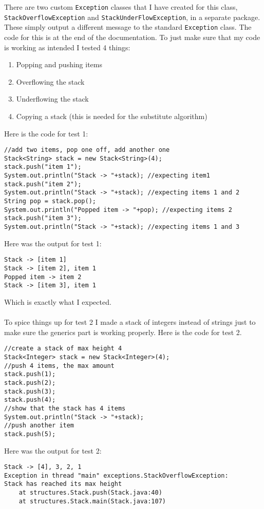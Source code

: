 \documentclass[../../../../main.tex]{subfiles}
\begin{document}
There are two custom \texttt{Exception} classes that I have created for this class, \texttt{StackOverflowException} and \texttt{StackUnderFlowException}, in a separate package. These simply output a different message to the standard \texttt{Exception} class. The code for this is at the end of the documentation.
\newpage
\noindent
To just make sure that my code is working as intended I tested 4 things:
\begin{enumerate}
\item Popping and pushing items
\item Overflowing the stack
\item Underflowing the stack
\item Copying a stack (this is needed for the substitute algorithm)
\end{enumerate}
Here is the code for test 1:
\begin{verbatim}
//add two items, pop one off, add another one
Stack<String> stack = new Stack<String>(4);
stack.push("item 1");
System.out.println("Stack -> "+stack); //expecting item1
stack.push("item 2");
System.out.println("Stack -> "+stack); //expecting items 1 and 2
String pop = stack.pop();
System.out.println("Popped item -> "+pop); //expecting items 2
stack.push("item 3");
System.out.println("Stack -> "+stack); //expecting items 1 and 3
\end{verbatim}
Here was the output for test 1:
\begin{verbatim}
Stack -> [item 1]
Stack -> [item 2], item 1
Popped item -> item 2
Stack -> [item 3], item 1
\end{verbatim}
Which is exactly what I expected.\\ \\
To spice things up for test 2 I made a stack of integers instead of strings just to make sure the generics part is working properly. Here is the code for test 2.
\begin{verbatim}
//create a stack of max height 4
Stack<Integer> stack = new Stack<Integer>(4);
//push 4 items, the max amount
stack.push(1);
stack.push(2);
stack.push(3);
stack.push(4);
//show that the stack has 4 items
System.out.println("Stack -> "+stack);
//push another item
stack.push(5);
\end{verbatim}
Here was the output for test 2:
\begin{verbatim}
Stack -> [4], 3, 2, 1
Exception in thread "main" exceptions.StackOverflowException:
Stack has reached its max height
	at structures.Stack.push(Stack.java:40)
	at structures.Stack.main(Stack.java:107)
\end{verbatim}
\end{document}
